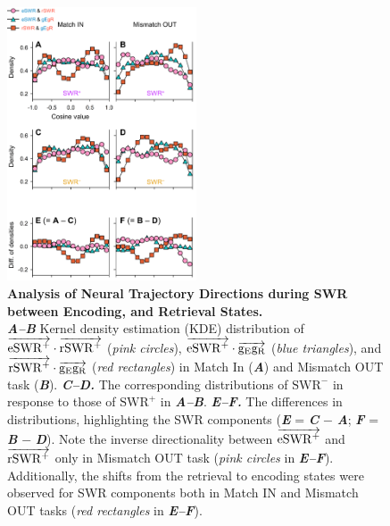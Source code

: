 \documentclass[final,3p,times,twocolumn]{elsarticle}
\begin{document}
        \clearpage
        \begin{figure}[ht]
        	\centering
            \includegraphics[width=0.5\textwidth]{./src/figures/.png/Figure_ID_07.png}
        	\caption{\textbf{
Analysis of Neural Trajectory Directions during SWR between Encoding, and Retrieval States.
}
\smallskip
\\
\textbf{\textit{A--B}} Kernel density estimation (KDE) distribution of $\protect\overrightarrow{{\mathrm{eSWR^+}}} \cdot \protect\overrightarrow{{\mathrm{rSWR^+}}}$ (\textit{pink circles}), $\protect\overrightarrow{{\mathrm{eSWR^+}}} \cdot \protect\overrightarrow{{\mathrm{g_{E}g_{R}}}}$ (\textit{blue triangles}), and $\protect\overrightarrow{{\mathrm{rSWR^+}}} \cdot \protect\overrightarrow{{\mathrm{g_{E}g_{R}}}}$ (\textit{red rectangles}) in Match In (\textbf{\textit{A}}) and Mismatch OUT task (\textbf{\textit{B}}). \textbf{\textit{C--D.}} The corresponding distributions of $\mathrm{SWR^-}$ in response to those of $\mathrm{SWR^+}$ in \textbf{\textit{A--B}}. \textbf{\textit{E--F.}} The differences in distributions, highlighting the SWR components (\textbf{\textit{E}} = \textbf{\textit{C}} $-$ \textbf{\textit{A}}; \textbf{\textit{F}} = \textbf{\textit{B}} $-$ \textbf{\textit{D}}). Note the inverse directionality between $\protect\overrightarrow{{\mathrm{eSWR^+}}}$ and $\protect\overrightarrow{{\mathrm{rSWR^+}}}$ only in Mismatch OUT task (\textit{pink circles} in \textbf{\textit{E--F}}). Additionally, the shifts from the retrieval to encoding states were observed for SWR components both in Match IN and Mismatch OUT tasks (\textit{red rectangles} in \textbf{\textit{E--F}}).
}
        	\label{fig:07}
        \end{figure}
\end{document}
